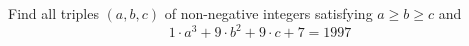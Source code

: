 Find all triples $(a,b,c)$ of non-negative integers satisfying $a\ge b\ge c$ and\[1\cdot a^3+9\cdot b^2+9\cdot c+7=1997 \]